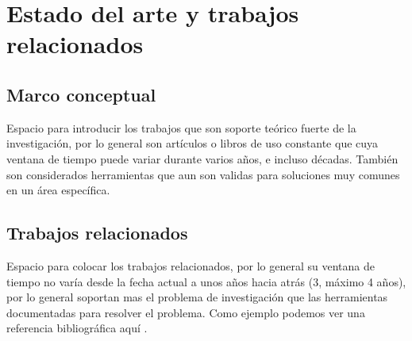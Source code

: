 
\chapter{Estado del arte y trabajos relacionados}
\ifpdf
    \graphicspath{{Chapter1/Chapter1Figs/PNG/}{Chapter1/Chapter1Figs/PDF/}{Chapter1/Chapter1Figs/}}
\else
    \graphicspath{{Chapter1/Chapter1Figs/EPS/}{Chapter1/Chapter1Figs/}}
\fi

\section{Marco conceptual}

Espacio para introducir los trabajos que son soporte teórico fuerte de la investigación, por lo general son artículos o libros de uso constante que cuya ventana de tiempo puede variar durante varios años, e incluso décadas. También son considerados herramientas que aun son validas para soluciones muy comunes en un área específica.

\section{Trabajos relacionados}

Espacio para colocar los trabajos relacionados, por lo general su ventana de tiempo no varía desde la fecha actual a unos años hacia atrás (3, máximo 4 años), por lo general soportan mas el problema de investigación que las herramientas documentadas para resolver el problema. Como ejemplo podemos ver una referencia bibliográfica aquí \cite{6955337}.



